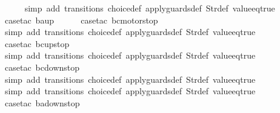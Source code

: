 \begin{isabellebody}
\ \ \ \ \isamarkupfalse%
\ {\isacharparenleft}simp\ add{\isacharcolon}\ transitions\ choice{\isacharunderscore}def\ apply{\isacharunderscore}guards{\isacharunderscore}def\ Str{\isacharunderscore}def\ value{\isacharunderscore}eq{\isacharunderscore}true{\isacharparenright}\isanewline
\ \ \ \isamarkupfalse%
\ {\isacharparenleft}case{\isacharunderscore}tac\ {\isachardoublequoteopen}ba{\isacharequal}up{}{}{\isachardoublequoteclose}{\isacharparenright}\isanewline
\ \ \ \ \isamarkupfalse%
\ {\isacharparenleft}case{\isacharunderscore}tac\ {\isachardoublequoteopen}bc{\isacharequal}motorstop{}{\isachardoublequoteclose}{\isacharparenright}\isanewline
\ \ \ \ \ \isamarkupfalse%
\ {\isacharparenleft}simp\ add{\isacharcolon}\ transitions\ choice{\isacharunderscore}def\ apply{\isacharunderscore}guards{\isacharunderscore}def\ Str{\isacharunderscore}def\ value{\isacharunderscore}eq{\isacharunderscore}true{\isacharparenright}\isanewline
\ \ \ \ \isamarkupfalse%
\ {\isacharparenleft}case{\isacharunderscore}tac\ {\isachardoublequoteopen}bc{\isacharequal}up{}{}stop{\isachardoublequoteclose}{\isacharparenright}\isanewline
\ \ \ \ \ \isamarkupfalse%
\ {\isacharparenleft}simp\ add{\isacharcolon}\ transitions\ choice{\isacharunderscore}def\ apply{\isacharunderscore}guards{\isacharunderscore}def\ Str{\isacharunderscore}def\ value{\isacharunderscore}eq{\isacharunderscore}true{\isacharparenright}\isanewline
\ \ \ \ \isamarkupfalse%
\ {\isacharparenleft}case{\isacharunderscore}tac\ {\isachardoublequoteopen}bc{\isacharequal}down{}{}stop{\isachardoublequoteclose}{\isacharparenright}\isanewline
\ \ \ \ \ \isamarkupfalse%
\ {\isacharparenleft}simp\ add{\isacharcolon}\ transitions\ choice{\isacharunderscore}def\ apply{\isacharunderscore}guards{\isacharunderscore}def\ Str{\isacharunderscore}def\ value{\isacharunderscore}eq{\isacharunderscore}true{\isacharparenright}\isanewline
\ \ \isamarkupfalse%
\ {\isacharparenleft}simp\ add{\isacharcolon}\ transitions\ choice{\isacharunderscore}def\ apply{\isacharunderscore}guards{\isacharunderscore}def\ Str{\isacharunderscore}def\ value{\isacharunderscore}eq{\isacharunderscore}true{\isacharparenright}\isanewline
\ \ \ \isamarkupfalse%
\ {\isacharparenleft}case{\isacharunderscore}tac\ {\isachardoublequoteopen}ba{\isacharequal}down{}{}stop{\isachardoublequoteclose}{\isacharparenright}\isanewline

\end{isabellebody}
